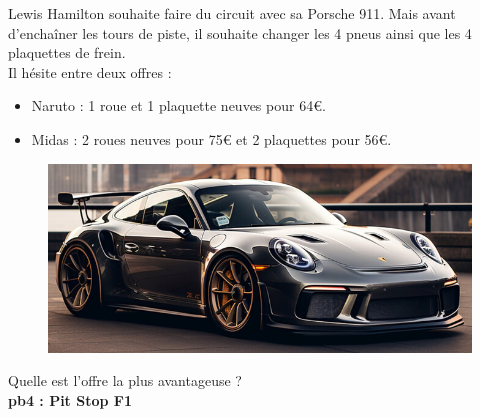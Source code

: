 \begin{multicols}{2} 

Lewis Hamilton souhaite faire du circuit avec sa Porsche 911. Mais avant d'enchaîner les tours de piste, il souhaite changer les 4 pneus ainsi que les 4 plaquettes de frein. \\

Il hésite entre deux offres : 

\begin{itemize}[label={$\bullet$}]
  \item Naruto : 1 roue et 1 plaquette neuves pour 64€.
  \item Midas : 2 roues neuves pour 75€ et 2 plaquettes pour 56€. 
\end{itemize} \columnbreak

\begin{figure}[H]
  \centering
  \includegraphics[width=0.9\linewidth]{5x2-inegalite-triangulaire/porsche.png}
\end{figure} 
\end{multicols}

Quelle est l'offre la plus avantageuse ?\\

\textbf{pb4 : Pit Stop F1} \\

